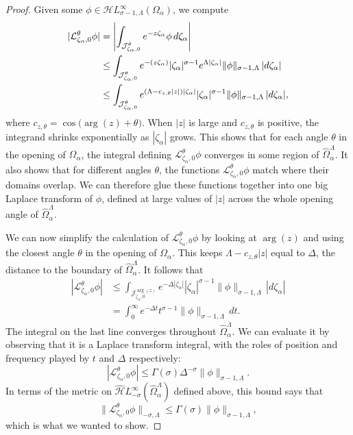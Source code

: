 \documentclass{article}
\let\Re\relax
\DeclareMathOperator{\Re}{Re}
\newcommand{\singexp}[2]{\mathcal{H}L^\infty_{#1, #2}}
\newcommand{\dualsingexp}[1]{\widehat{\mathcal{H}}L^\infty_{#1}}
\newcommand{\laplace}{\mathcal{L}}
\theoremstyle{definition}
\theoremstyle{plain}
\begin{document}
\begin{proof}
Given some $\phi \in \singexp{\sigma-1}{\Lambda}(\Omega_\alpha)$, we compute
\begin{align*}
|\laplace_{\zeta_\alpha, 0}^\theta \phi| & = \left| \int_{\mathcal{J}_{\zeta_\alpha, 0}^\theta} e^{-z\zeta_\alpha} \phi\,d\zeta_\alpha \right| \\
& \le \int_{\mathcal{J}_{\zeta_\alpha,0}^\theta} e^{-\Re(z\zeta_\alpha)} |\zeta_\alpha|^{\sigma-1} e^{\Lambda |\zeta_\alpha|} \|\phi\|_{\sigma-1, \Lambda}\,|d\zeta_\alpha| \\
& \le \int_{\mathcal{J}_{\zeta_\alpha,0}^\theta} e^{(\Lambda - c_{z, \theta}|z|)|\zeta_\alpha|} |\zeta_\alpha|^{\sigma-1} \|\phi\|_{\sigma-1, \Lambda}\,|d\zeta_\alpha|,
\end{align*}
where $c_{z, \theta} = \cos\big(\arg(z) + \theta\big)$. When $|z|$ is large and $c_{z, \theta}$ is positive, the integrand shrinks exponentially as $|\zeta_\alpha|$ grows. This shows that for each angle $\theta$ in the opening of $\Omega_\alpha$, the integral defining $\laplace_{\zeta_\alpha, 0}^\theta \phi$ converges in some region of $\widehat{\Omega}_\alpha^\Lambda$. It also shows that for different angles $\theta$, the functions $\laplace_{\zeta_\alpha, 0}^\theta \phi$ match where their domains overlap. We can therefore glue these functions together into one big Laplace transform of $\phi$, defined at large values of $|z|$ across the whole opening angle of $\widehat{\Omega}_\alpha^\Lambda$.

We can now simplify the calculation of $\laplace_{\zeta_\alpha, 0}^\theta \phi$ by looking at $\arg(z)$ and using the closest angle $\theta$ in the opening of $\Omega_\alpha$. This keeps $\Lambda - c_{z, \theta}|z|$ equal to $\Delta$, the distance to the boundary of $\widehat{\Omega}_\alpha^\Lambda$. It follows that
\begin{align*}
|\laplace_{\zeta_\alpha, 0}^\theta \phi| & \le \int_{\mathcal{J}_{\zeta_\alpha, 0}^{\arg(z)}} e^{-\Delta|\zeta_\alpha|} |\zeta_\alpha|^{\sigma-1} \|\phi\|_{\sigma-1, \Lambda}\,|d\zeta_\alpha| \\
& = \int_0^\infty e^{-\Delta t} t^{\sigma-1} \|\phi\|_{\sigma-1, \Lambda}\,dt.
\end{align*}
The integral on the last line converges throughout $\widehat{\Omega}_\alpha^\Lambda$. We can evaluate it by observing that it is a Laplace transform integral, with the roles of position and frequency played by $t$ and $\Delta$ respectively:
\[ |\laplace_{\zeta_\alpha, 0}^\theta \phi| \le \Gamma(\sigma) \Delta^{-\sigma} \|\phi\|_{\sigma-1, \Lambda}. \]
In terms of the metric on $\dualsingexp{-\sigma}(\widehat{\Omega}_\alpha^\Lambda)$ defined above, this bound says that
\[ \|\laplace_{\zeta_\alpha, 0}^\theta \phi\|_{-\sigma, \Lambda} \le \Gamma(\sigma) \|\phi\|_{\sigma-1, \Lambda}, \]
which is what we wanted to show.
\end{proof}
\end{document}
